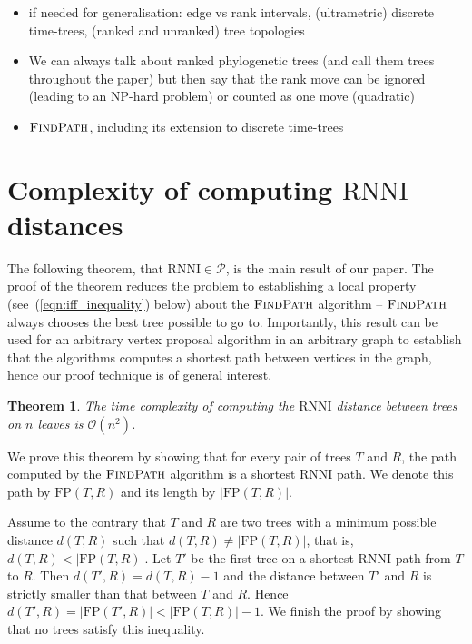 \documentclass[11pt]{amsart}
\newtheorem{theorem}{Theorem}
\newcommand{\rnni}{\mathrm{RNNI}}
\newcommand{\findpath}{\textsc{FindPath}}
\newcommand{\fp}{\mathrm{FP}}
\newcommand{\p}{\mathcal{P}}
\renewcommand{\O}{\mathcal O}
\newcommand{\summary}[1]{} %
\begin{document}
\begin{itemize}
\item if needed for generalisation: edge vs rank intervals, (ultrametric) discrete time-trees, (ranked and unranked) tree topologies
\item We can always talk about ranked phylogenetic trees (and call them trees throughout the paper) but then say that the rank move can be ignored (leading to an NP-hard problem) or counted as one move (quadratic)
\item $\findpath$, including its extension to discrete time-trees
\end{itemize}


\section{Complexity of computing $\rnni$ distances}

\summary{A few words about the main theorem and its proof.}
The following theorem, that $\rnni \in \p$, is the main result of our paper.
The proof of the theorem reduces the problem to establishing a local property (see~(\ref{eqn:iff_inequality}) below) about the $\findpath$ algorithm -- $\findpath$ always chooses the best tree possible to go to.
Importantly, this result can be used for an arbitrary vertex proposal algorithm in an arbitrary graph to establish that the algorithms computes a shortest path between vertices in the graph, hence our proof technique is of general interest.

\begin{theorem}
The time complexity of computing the $\rnni$ distance between trees on $n$ leaves is $\O(n^2)$.
\label{thm:rnni_polynomial}
\end{theorem}

\proof
We prove this theorem by showing that for every pair of trees $T$ and $R$, the path computed by the $\findpath$ algorithm is a shortest $\rnni$ path.
We denote this path by $\fp(T, R)$ and its length by $|\fp(T, R)|$.

Assume to the contrary that $T$ and $R$ are two trees with a minimum possible distance $d(T, R)$ such that $d(T,R) \neq |\fp(T,R)|$, that is, $d(T,R) < |\fp(T,R)|$.
Let $T'$ be the first tree on a shortest $\rnni$ path from $T$ to $R$.
Then $d(T',R) = d(T, R) - 1$ and the distance between $T'$ and $R$ is strictly smaller than that between $T$ and $R$.
Hence $d(T', R) = |\fp(T',R)| < |\fp(T,R)| - 1$.
We finish the proof by showing that no trees satisfy this inequality.
\end{document}
